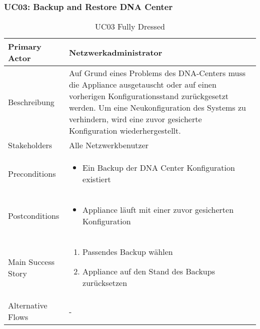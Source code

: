 \subsubsection{UC03: Backup and Restore DNA Center}
\begin{table}[H]
	\centering
	\begin{tabularx}{\textwidth}{l | X}
		Primary Actor   & Netzwerkadministrator        \\
		\hline
		Beschreibung   & Auf Grund eines Problems des DNA-Centers muss die Appliance ausgetauscht oder auf einen vorherigen Konfigurationsstand zurückgesetzt werden. Um eine Neukonfiguration des Systems zu verhindern, wird eine zuvor gesicherte Konfiguration wiederhergestellt.  \\ 
		\hline
		Stakeholders       & Alle Netzwerkbenutzer \\ 
		Preconditions      &
		\begin{itemize}	
			\item Ein Backup der DNA Center Konfiguration existiert
		\end{itemize}  \\
		\hline
		Postconditions     & 
		\begin{itemize}	
			\item Appliance läuft mit einer zuvor gesicherten Konfiguration
		\end{itemize}  \\
		\hline
		Main Success Story & 
		\begin{enumerate}
			\item Passendes Backup wählen
			\item Appliance auf den Stand des Backups zurücksetzen
		\end{enumerate}
		\\
		\hline
		Alternative Flows  & -
	\end{tabularx}
	\caption{UC03 Fully Dressed}
	\label{tab:UC03}
\end{table}

